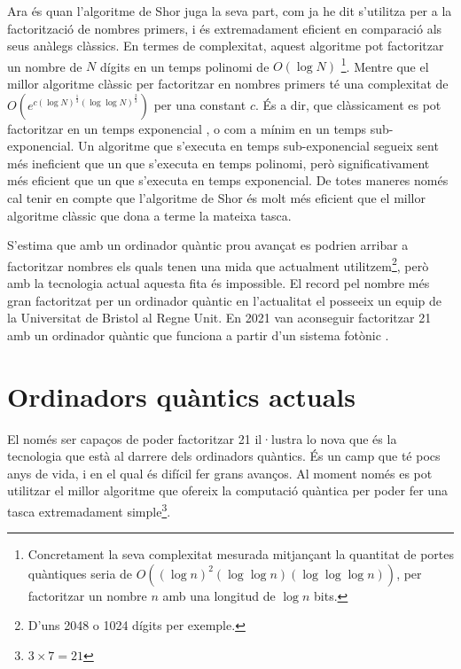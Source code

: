 Ara és quan l'algoritme de Shor juga la seva part, com ja he dit s'utilitza per a la factorització de nombres primers, i és extremadament eficient en comparació als seus anàlegs clàssics. En termes de complexitat, aquest algoritme pot factoritzar un nombre de $N$ dígits en un temps polinomi de $O(\log N)$ \footnote{Concretament la seva complexitat mesurada mitjançant la quantitat de portes quàntiques seria de $O((\log n)^2 (\log \log n) (\log \log \log n))$, per factoritzar un nombre $n$ amb una longitud de $\log n$ bits.}. Mentre que el millor algoritme clàssic per factoritzar en nombres primers té una complexitat de $O(e^{c(\log N)^\frac{1}{3} (\log \log N)^\frac{2}{3}})$ per una constant $c$. És a dir, que clàssicament es pot factoritzar en un temps exponencial \cite{Shor_97}, o com a mínim en un temps sub-exponencial. Un algoritme que s'executa en temps sub-exponencial segueix sent més ineficient que un que s'executa en temps polinomi, però significativament més eficient que un que s'executa en temps exponencial. De totes maneres només cal tenir en compte que l'algoritme de Shor és molt més eficient que el millor algoritme clàssic que dona a terme la mateixa tasca.

S'estima que amb un ordinador quàntic prou avançat es podrien arribar a factoritzar nombres els quals tenen una mida que actualment utilitzem\footnote{D'uns 2048 o 1024 dígits per exemple.}, però amb la tecnologia actual aquesta fita és impossible. El record pel nombre més gran factoritzat per un ordinador quàntic en l'actualitat el posseeix un equip de la Universitat de Bristol al Regne Unit. En 2021 van aconseguir factoritzar 21 amb un ordinador quàntic que funciona a partir d'un sistema fotònic \cite{21_factoritzation}.

\section{Ordinadors quàntics actuals}
El només ser capaços de poder factoritzar 21 il·lustra lo nova que és la tecnologia que està al darrere dels ordinadors quàntics. És un camp que té pocs anys de vida, i en el qual és difícil fer grans avanços. Al moment només es pot utilitzar el millor algoritme que ofereix la computació quàntica per poder fer una tasca extremadament simple\footnote{$3 \times 7 = 21$}.

